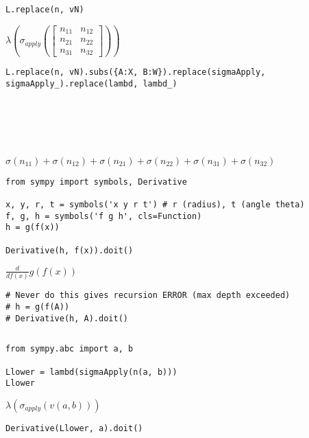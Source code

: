 \documentclass[
]{article}
\begin{document}
\begin{verbatim}
L.replace(n, vN)
\end{verbatim}

\(\displaystyle \lambda{\left(\sigma_{apply}{\left(\left[\begin{matrix}n_{11} & n_{12}\\n_{21} & n_{22}\\n_{31} & n_{32}\end{matrix}\right] \right)} \right)}\)

\begin{verbatim}
L.replace(n, vN).subs({A:X, B:W}).replace(sigmaApply, sigmaApply_).replace(lambd, lambd_)






\end{verbatim}

\(\displaystyle \sigma{\left(n_{11} \right)} + \sigma{\left(n_{12} \right)} + \sigma{\left(n_{21} \right)} + \sigma{\left(n_{22} \right)} + \sigma{\left(n_{31} \right)} + \sigma{\left(n_{32} \right)}\)

\begin{verbatim}
from sympy import symbols, Derivative

x, y, r, t = symbols('x y r t') # r (radius), t (angle theta)
f, g, h = symbols('f g h', cls=Function)
h = g(f(x))

Derivative(h, f(x)).doit()
\end{verbatim}

\(\displaystyle \frac{d}{d f{\left(x \right)}} g{\left(f{\left(x \right)} \right)}\)

\begin{verbatim}
# Never do this gives recursion ERROR (max depth exceeded)
# h = g(f(A))
# Derivative(h, A).doit()
\end{verbatim}

\begin{verbatim}

\end{verbatim}

\begin{verbatim}
from sympy.abc import a, b

Llower = lambd(sigmaApply(n(a, b)))
Llower
\end{verbatim}

\(\displaystyle \lambda{\left(\sigma_{apply}{\left(v{\left(a,b \right)} \right)} \right)}\)

\begin{verbatim}
Derivative(Llower, a).doit()
\end{verbatim}
\end{document}
